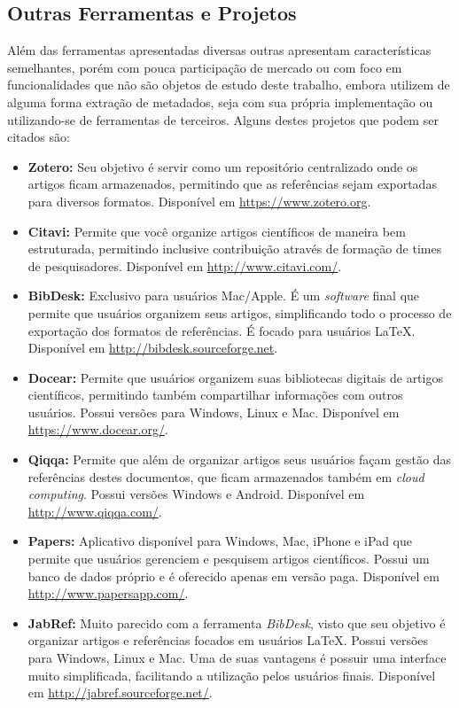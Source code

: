 \subsection{Outras Ferramentas e Projetos}
\label{ssec:other-tools}

Além das ferramentas apresentadas diversas outras apresentam características semelhantes, porém com pouca participação de mercado ou com foco em funcionalidades que não são objetos de estudo deste trabalho, embora utilizem de alguma forma extração de metadados, seja com sua própria implementação ou utilizando-se de ferramentas de terceiros. Alguns destes projetos que podem ser citados são:

\begin{itemize}
    \item \textbf{Zotero:} Seu objetivo é servir como um repositório centralizado onde os artigos ficam armazenados, permitindo que as referências sejam exportadas para diversos formatos. Disponível em \url{https://www.zotero.org}.
    \item \textbf{Citavi:} Permite que você organize artigos científicos de maneira bem estruturada, permitindo inclusive contribuição através de formação de times de pesquisadores. Disponível em \url{http://www.citavi.com/}.
    \item \textbf{BibDesk:} Exclusivo para usuários Mac/Apple. É um \emph{software} final que permite que usuários organizem seus artigos, simplificando todo o processo de exportação dos formatos de referências. É focado para usuários \LaTeX. Disponível em \url{http://bibdesk.sourceforge.net}.
    \item \textbf{Docear:} Permite que usuários organizem suas bibliotecas digitais de artigos científicos, permitindo também compartilhar informações com outros usuários. Possui versões para Windows, Linux e Mac. Disponível em \url{https://www.docear.org/}.
    \item \textbf{Qiqqa:} Permite que além de organizar artigos seus usuários façam gestão das referências destes documentos, que ficam armazenados também em \emph{cloud computing}. Possui versões Windows e Android. Disponível em \url{http://www.qiqqa.com/}.
    \item \textbf{Papers:} Aplicativo disponível para Windows, Mac, iPhone e iPad que permite que usuários gerenciem e pesquisem artigos científicos. Possui um banco de dados próprio e é oferecido apenas em versão paga. Disponível em \url{http://www.papersapp.com/}.
    \item \textbf{JabRef:} Muito parecido com a ferramenta \emph{BibDesk}, visto que seu objetivo é organizar artigos e referências focados em usuários \LaTeX. Possui versões para Windows, Linux e Mac. Uma de suas vantagens é possuir uma interface muito simplificada, facilitando a utilização pelos usuários finais. Disponível em \url{http://jabref.sourceforge.net/}.

\end{itemize}
